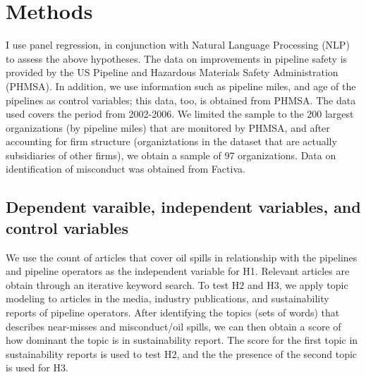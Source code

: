 \section{Methods}

I use panel regression, in conjunction with Natural Language Processing (NLP) to assess the above hypotheses. The data on improvements in pipeline safety is provided by the US Pipeline and Hazardous Materials Safety Administration (PHMSA). In addition, we use information such as pipeline miles, and age of the pipelines as control variables; this data, too, is obtained from PHMSA. The data used covers the period from 2002-2006. We limited the sample to the 200 largest organizations (by pipeline miles) that are monitored by PHMSA, and after accounting for firm structure (organiztations in the dataset that are actually subsidiaries of other firms), we obtain a sample of 97 organizations. Data on identification of misconduct was obtained from Factiva. 

\subsection{Dependent varaible, independent variables, and control variables}

We use the count of articles that cover oil spills in relationship with the pipelines and pipeline operators as the independent variable for H1. Relevant articles are obtain through an iterative keyword search. To test H2 and H3, we apply topic modeling \citep{Hannigan2019} to articles in the media, industry publications, and sustainability reports of pipeline operators. After identifying the topics (sets of words) that describes near-misses and misconduct/oil spills, we can then obtain a score of how dominant the topic is in sustainability report. The score for the first topic in sustainability reports is used to test H2, and the the presence of the second topic is used for H3. 